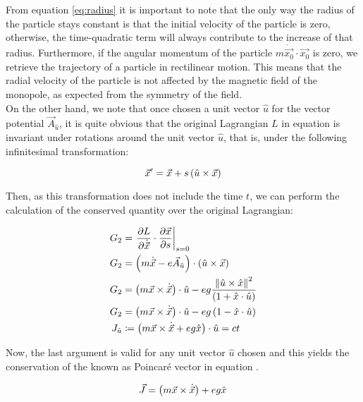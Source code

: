 From equation \ref{eq:radius} it is important to note that the only way the radius of the particle stays constant is that the initial velocity of the particle is zero, otherwise, the time-quadratic term will always contribute to the increase of that radius. Furthermore, if the angular momentum of the particle $m\dot{\vec{x_0}}\cdot\vec{x_0}$ is zero, we retrieve the trajectory of a particle in rectilinear motion. This means that the radial velocity of the particle is not affected by the magnetic field of the monopole, as expected from the symmetry of the field.\\

On the other hand, we note that once chosen a unit vector $\hat{u}$ for the vector potential  $\vec{A}_{\hat{u}}$, it is quite obvious that the original Lagrangian $L$ in equation  is invariant under rotations around the unit vector $\hat{u}$, that is, under the following infinitesimal transformation:

\begin{equation}
\vec{x}' = \vec{x} + s\left( \hat{u}\times\vec{x} \right)
\label{eq:rotinv}
\end{equation}

Then, as this transformation does not include the time $t$, we can perform the calculation of the conserved quantity over the original Lagrangian:

\begin{align*}
G_2 &= \left. \frac{\partial L}{\partial \dot{\vec{x}}}\cdot\frac{\partial \vec{x}}{\partial s} \right|_{s=0}\\
G_2 &= \left( m\dot{\vec{x}} - e\vec{A}_{\hat{u}} \right)\cdot \left( \hat{u}\times\vec{x} \right) \\
G_2 &= \left( m\vec{x}\times\dot{\vec{x}} \right)\cdot\hat{u}-eg\frac{\left\lVert \hat{u}\times\hat{x} \right\rVert^2}{\left( 1+\hat{x}\cdot\hat{u} \right)}\\
G_2 &= \left( m\vec{x}\times\dot{\vec{x}} \right)\cdot\hat{u} -eg\left( 1-\hat{x}\cdot\hat{u} \right)\\
J_{\hat{u}} &\coloneqq \left( {m\vec{x}\times\dot{\vec{x}}}+ eg\hat{x} \right)\cdot\hat{u} = ct
\end{align*}

Now, the last argument is valid for any unit vector $\hat{u}$ chosen and this yields the conservation of the  known as Poincar\'e vector in equation .

\begin{equation}
\vec{J} = \left( m\vec{x}\times\dot{\vec{x}} \right)+ eg\hat{x}
\label{eq:poincarevec}
\end{equation}

